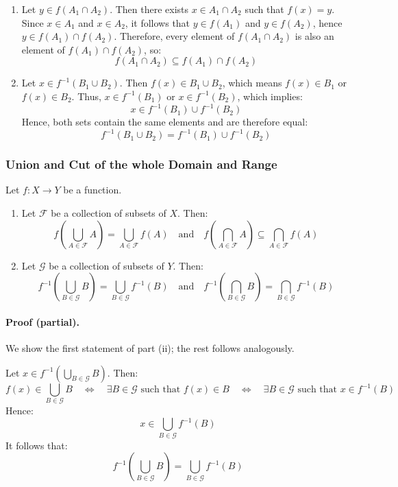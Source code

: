 \begin{enumerate}
    \item Let \( y \in f(A_1 \cap A_2) \). Then there exists \( x \in A_1 \cap A_2 \) such that \( f(x) = y \). Since \( x \in A_1 \) and \( x \in A_2 \), it follows that \( y \in f(A_1) \) and \( y \in f(A_2) \), hence \( y \in f(A_1) \cap f(A_2) \). Therefore, every element of \( f(A_1 \cap A_2) \) is also an element of \( f(A_1) \cap f(A_2) \), so:
    \[
    f(A_1 \cap A_2) \subseteq f(A_1) \cap f(A_2)
    \]
    
    \item Let \( x \in f^{-1}(B_1 \cup B_2) \). Then \( f(x) \in B_1 \cup B_2 \), which means \( f(x) \in B_1 \) or \( f(x) \in B_2 \). Thus, \( x \in f^{-1}(B_1) \) or \( x \in f^{-1}(B_2) \), which implies:
    \[
    x \in f^{-1}(B_1) \cup f^{-1}(B_2)
    \]
    Hence, both sets contain the same elements and are therefore equal:
    \[
    f^{-1}(B_1 \cup B_2) = f^{-1}(B_1) \cup f^{-1}(B_2)
    \]
\end{enumerate}

\subsubsection{Union and Cut of the whole Domain and Range}
Let \( f : X \to Y \) be a function.
\begin{enumerate}[label=\roman*)]
    \item Let \( \mathcal{F} \) be a collection of subsets of \( X \). Then:
    \[
    f\left( \bigcup_{A \in \mathcal{F}} A \right) = \bigcup_{A \in \mathcal{F}} f(A)
    \quad \text{and} \quad
    f\left( \bigcap_{A \in \mathcal{F}} A \right) \subseteq \bigcap_{A \in \mathcal{F}} f(A)
    \]
    
    \item Let \( \mathcal{G} \) be a collection of subsets of \( Y \). Then:
    \[
    f^{-1}\left( \bigcup_{B \in \mathcal{G}} B \right) = \bigcup_{B \in \mathcal{G}} f^{-1}(B)
    \quad \text{and} \quad
    f^{-1}\left( \bigcap_{B \in \mathcal{G}} B \right) = \bigcap_{B \in \mathcal{G}} f^{-1}(B)
    \]
\end{enumerate}

\paragraph{Proof (partial).}
We show the first statement of part (ii); the rest follows analogously.

Let \( x \in f^{-1} \left( \bigcup_{B \in \mathcal{G}} B \right) \). Then:
\[
f(x) \in \bigcup_{B \in \mathcal{G}} B
\quad \Leftrightarrow \quad
\exists B \in \mathcal{G} \text{ such that } f(x) \in B
\quad \Leftrightarrow \quad
\exists B \in \mathcal{G} \text{ such that } x \in f^{-1}(B)
\]
Hence:
\[
x \in \bigcup_{B \in \mathcal{G}} f^{-1}(B)
\]
It follows that:
\[
f^{-1} \left( \bigcup_{B \in \mathcal{G}} B \right) = \bigcup_{B \in \mathcal{G}} f^{-1}(B)
\]


